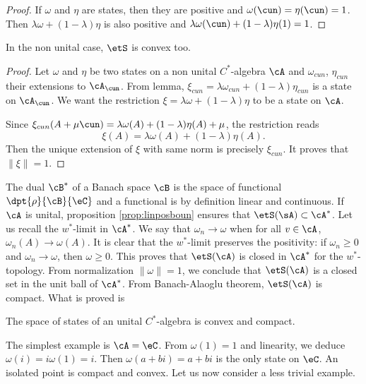 \begin{proof}
If $\omega$ and $\eta$ are states, then they are positive and $\omega(\cun)=\eta(\cun)=1$. Then $\lambda\omega+(1-\lambda)\eta$ is also positive and $\lambda\omega(\cun)+(1-\lambda)\eta(1)=1$.
\end{proof}

\begin{proposition}
In the non unital case, $\etS$ is convex too.
\end{proposition}

\begin{proof}
Let $\omega$ and $\eta$ be two states on a non unital $C^*$-algebra $\cA$ and $\omega_{cun}$, $\eta_{cun}$ their extensions to $\cA_{\cun}$. From lemma, $\xi_{cun}=\lambda\omega_{cun}+(1-\lambda)\eta_{cun}$ is a state on $\cA_{\cun}$. We want the restriction $\xi=\lambda\omega+(1-\lambda)\eta$ to be a state on $\cA$.

Since $\xi_{cun}(A+\mu\cun)=\lambda\omega(A)+(1-\lambda)\eta(A)+\mu$, the restriction reads
\[ 
  \xi(A)=\lambda\omega(A)+(1-\lambda)\eta(A).
\]
Then the unique extension of $\xi$ with same norm is precisely $\xi_{cun}$. It proves that $\| \xi \|=1$.
\end{proof}

The dual $\cB^*$ of a Banach space $\cB$ is the space of functional $\dpt{\rho}{\cB}{\eC}$ and a functional is by definition linear and continuous. If $\cA$ is unital, proposition \ref{prop:linposboun} ensures that $\etS(\sA)\subset\cA^*$. Let us recall the $w^*$-limit in $\cA^*$. We say that $\omega_n\to \omega$ when for all $v\in\cA$, $\omega_n(A)\to \omega(A)$. It is clear that the $w^*$-limit preserves the positivity: if $\omega_n\geq0$ and $\omega_n\to \omega$, then $\omega\geq 0$. This proves that $\etS(\cA)$ is closed in $\cA^*$ for the $w^*$-topology. From normalization $\| \omega \|=1$, we conclude  that $\etS(\cA)$ is a closed set in the unit ball of $\cA^*$. From Banach-Alaoglu theorem, $\etS(\cA)$ is compact. What is proved is

\begin{proposition}
The space of states of an unital $C^*$-algebra is convex and compact.
\end{proposition}

The simplest example is $\cA=\eC$. From $\omega(1)=1$ and linearity, we deduce $\omega(i)=i\omega(1)=i$. Then $\omega(a+bi)=a+bi$ is the only state on $\eC$. An isolated point is compact and convex. Let us now consider a less trivial example.

